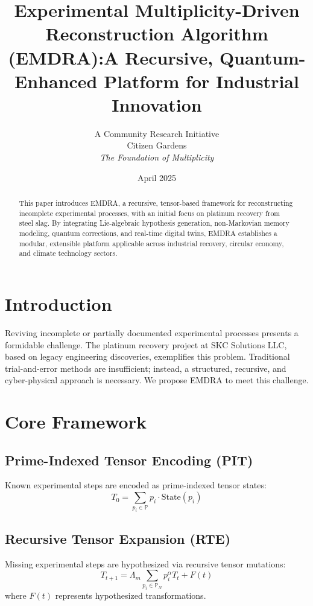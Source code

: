 \documentclass[12pt]{article}
\title{\textbf{Experimental Multiplicity-Driven Reconstruction Algorithm (EMDRA):\newline A Recursive, Quantum-Enhanced Platform for Industrial Innovation}}
\author{A Community Research Initiative \\ Citizen Gardens \\ \textit{The Foundation of Multiplicity}}
\date{April 2025}
\begin{document}
\maketitle

\begin{abstract}
This paper introduces EMDRA, a recursive, tensor-based framework for reconstructing incomplete experimental processes, with an initial focus on platinum recovery from steel slag. By integrating Lie-algebraic hypothesis generation, non-Markovian memory modeling, quantum corrections, and real-time digital twins, EMDRA establishes a modular, extensible platform applicable across industrial recovery, circular economy, and climate technology sectors.
\end{abstract}

\tableofcontents

\section{Introduction}
Reviving incomplete or partially documented experimental processes presents a formidable challenge. The platinum recovery project at SKC Solutions LLC, based on legacy engineering discoveries, exemplifies this problem. Traditional trial-and-error methods are insufficient; instead, a structured, recursive, and cyber-physical approach is necessary. We propose EMDRA to meet this challenge.

\section{Core Framework}
\subsection{Prime-Indexed Tensor Encoding (PIT)}
Known experimental steps are encoded as prime-indexed tensor states:
\begin{equation}
T_0 = \sum_{p_i \in \mathbb{P}} p_i \cdot \text{State}(p_i)
\end{equation}

\subsection{Recursive Tensor Expansion (RTE)}
Missing experimental steps are hypothesized via recursive tensor mutations:
\begin{equation}
T_{t+1} = \Lambda_m \sum_{p_i \in \mathbb{P}_N} p_i^\alpha T_t + F(t)
\end{equation}
where $F(t)$ represents hypothesized transformations.
\end{document}
